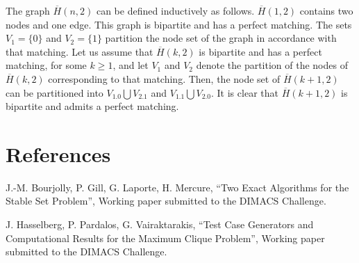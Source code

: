 The graph $\overline H (n,2)$ can be defined inductively as follows.  
$\overline H (1,2)$ contains two nodes and one edge.  
This graph is bipartite and has a perfect matching.
The sets $V_1=\{0\}$ and $V_2=\{1\}$ partition the node set of the graph in accordance with that matching.
Let us assume that $\overline H (k,2)$ is bipartite and has a perfect matching, for some $k \ge 1$, and let $V_1$ and $V_2$ denote the partition of the nodes of $\overline H (k,2)$ corresponding to that matching. 
Then, the node set of $\overline H (k+1,2)$ can be partitioned into $V_1.0 \bigcup V_2.1$ and $V_1.1 \bigcup V_2.0$.
It is clear that $\overline H (k+1,2)$ is bipartite and admits a perfect matching.


\section*{References}

\noindent
[1] J.-M. Bourjolly, P. Gill, G. Laporte, H. Mercure, ``Two Exact Algorithms for the Stable Set Problem'', Working paper submitted to the DIMACS Challenge.

\noindent
[2] J. Hasselberg, P. Pardalos, G. Vairaktarakis, ``Test Case Generators and Computational Results for the Maximum Clique Problem'', Working paper submitted to the DIMACS Challenge.




